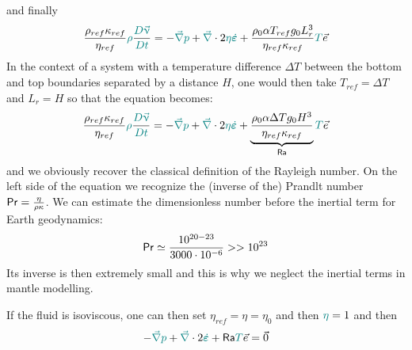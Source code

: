 and finally 
\[
\frac{\rho_{ref} \kappa_{ref}}{\eta_{ref}}
{\color{teal}\rho} \frac{{\color{teal} D \vec\upnu}}{\color{teal} D t}
=
-{\color{teal} \vec\nabla} {\color{teal}p} + {\color{teal} \vec\nabla} \cdot 2 {\color{teal} \eta} {\color{teal} \dot{\bm\varepsilon}}
+ \frac{\rho_0\alpha T_{ref} g_0 L_r^3}{\eta_{ref} \kappa_{ref}} {\color{teal} T} \vec{e}
\]
In the context of a system with a temperature difference $\Delta T$ 
between the bottom and top boundaries separated by a distance $H$, one would then take $T_{ref} = \Delta T$ and $L_r=H$ so that the equation becomes:
\[
\frac{\rho_{ref} \kappa_{ref}}{\eta_{ref}}
{\color{teal}\rho} \frac{{\color{teal} D \vec\upnu}}{\color{teal} D t}
=
-{\color{teal} \vec\nabla} {\color{teal}p} + {\color{teal} \vec\nabla} \cdot 2 {\color{teal} \eta} {\color{teal} \dot{\bm\varepsilon}}
+ \underbrace{\frac{\rho_0\alpha \Delta T g_0 H^3}{\eta_{ref} \kappa_{ref}} }_{{\mathsf{Ra}}} {\color{teal} T}\vec{e}
\]
and we obviously recover the classical definition of the Rayleigh number.
On the left side of the equation we recognize the (inverse of the) Prandlt number ${\mathsf{Pr}}=\frac{\eta}{\rho \kappa}$. 
We can estimate the dimensionless number before the inertial term for Earth
geodynamics:
\[
{\mathsf{Pr}} \simeq \frac{10^{20-23}}{3000 \cdot 10^{-6}} >> 10^{23}
\]
Its inverse is then extremely small and this is why we neglect the inertial terms
in mantle modelling.


If the fluid is isoviscous, one can then set $\eta_{ref}=\eta=\eta_0$ and then ${\color{teal}\eta}=1$ and then 
\[
-{\color{teal} \vec\nabla} {\color{teal}p} + {\color{teal} \vec\nabla} \cdot 2  {\color{teal} \dot{\bm\varepsilon}}
+ {\mathsf{Ra}} {\color{teal} T} \vec{e}= \vec{0}
\]

